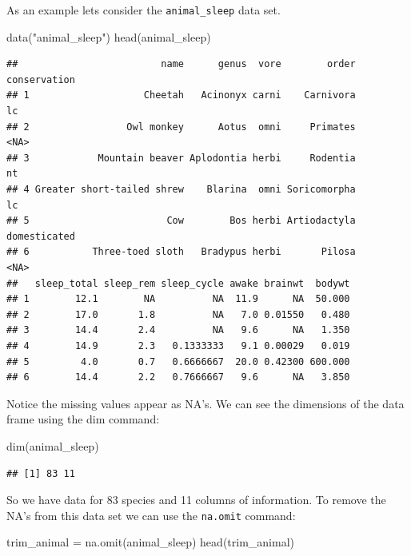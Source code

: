 \documentclass[
]{book}
\newenvironment{Shaded}{\begin{snugshade}}{\end{snugshade}}
\newcommand{\FunctionTok}[1]{\textcolor[rgb]{0.00,0.00,0.00}{#1}}
\newcommand{\NormalTok}[1]{#1}
\newcommand{\OtherTok}[1]{\textcolor[rgb]{0.56,0.35,0.01}{#1}}
\newcommand{\StringTok}[1]{\textcolor[rgb]{0.31,0.60,0.02}{#1}}
\theoremstyle{definition}
\theoremstyle{definition}
\theoremstyle{definition}
\theoremstyle{definition}
\theoremstyle{remark}
\begin{document}
As an example lets consider the \texttt{animal\_sleep} data set.

\begin{Shaded}
\begin{Highlighting}[]
\FunctionTok{data}\NormalTok{(}\StringTok{"animal\_sleep"}\NormalTok{)}
\FunctionTok{head}\NormalTok{(animal\_sleep)}
\end{Highlighting}
\end{Shaded}

\begin{verbatim}
##                         name      genus  vore        order conservation
## 1                    Cheetah   Acinonyx carni    Carnivora           lc
## 2                 Owl monkey      Aotus  omni     Primates         <NA>
## 3            Mountain beaver Aplodontia herbi     Rodentia           nt
## 4 Greater short-tailed shrew    Blarina  omni Soricomorpha           lc
## 5                        Cow        Bos herbi Artiodactyla domesticated
## 6           Three-toed sloth   Bradypus herbi       Pilosa         <NA>
##   sleep_total sleep_rem sleep_cycle awake brainwt  bodywt
## 1        12.1        NA          NA  11.9      NA  50.000
## 2        17.0       1.8          NA   7.0 0.01550   0.480
## 3        14.4       2.4          NA   9.6      NA   1.350
## 4        14.9       2.3   0.1333333   9.1 0.00029   0.019
## 5         4.0       0.7   0.6666667  20.0 0.42300 600.000
## 6        14.4       2.2   0.7666667   9.6      NA   3.850
\end{verbatim}

Notice the missing values appear as NA's. We can see the dimensions of the data frame using the dim command:

\begin{Shaded}
\begin{Highlighting}[]
\FunctionTok{dim}\NormalTok{(animal\_sleep)}
\end{Highlighting}
\end{Shaded}

\begin{verbatim}
## [1] 83 11
\end{verbatim}

So we have data for 83 species and 11 columns of information. To remove the NA's from this data set we can use the \texttt{na.omit} command:

\begin{Shaded}
\begin{Highlighting}[]
\NormalTok{trim\_animal }\OtherTok{=} \FunctionTok{na.omit}\NormalTok{(animal\_sleep)}
\FunctionTok{head}\NormalTok{(trim\_animal)}
\end{Highlighting}
\end{Shaded}
\end{document}

